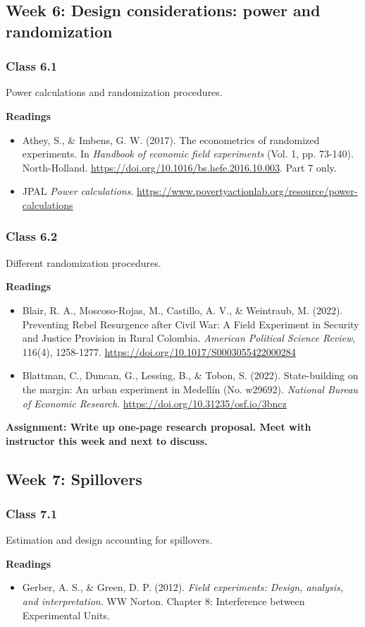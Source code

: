 \documentclass[letterpaper,12pt,parskip=full,DIV=10]{scrartcl}
\newcommand{\courseweek}[2]{\Needspace{12\baselineskip}\subsection*{Week #1: #2}}
\newcommand{\class}[2]{\Needspace{9\baselineskip}\subsubsection*{Class #1}\nopagebreak #2\par\nopagebreak\textbf{Readings}\par\nopagebreak}
\begin{document}
\courseweek{6}{Design considerations: power and randomization}

\class{6.1}{Power calculations and randomization procedures.}

\begin{itemize}

\item Athey, S., \& Imbens, G. W. (2017). The econometrics of randomized experiments. In \emph{Handbook of economic field experiments} (Vol. 1, pp. 73-140). North-Holland. \url{https://doi.org/10.1016/bs.hefe.2016.10.003}. Part 7 only.

\item JPAL \emph{Power calculations}.  \url{https://www.povertyactionlab.org/resource/power-calculations}

\end{itemize}

\class{6.2}{Different randomization procedures.}

\begin{itemize}

\item Blair, R. A., Moscoso-Rojas, M., Castillo, A. V., \& Weintraub, M. (2022). Preventing Rebel Resurgence after Civil War: A Field Experiment in Security and Justice Provision in Rural Colombia. \emph{American Political Science Review}, 116(4), 1258-1277. \url{https://doi.org/10.1017/S0003055422000284}

\item Blattman, C., Duncan, G., Lessing, B., \& Tobon, S. (2022). State-building on the margin: An urban experiment in Medellín (No. w29692). \emph{National Bureau of Economic Research}. \url{https://doi.org/10.31235/osf.io/3bncz}

\end{itemize}

\textbf{Assignment: Write up one-page research proposal. Meet with instructor this week and next to discuss.}

\courseweek{7}{Spillovers}

\class{7.1}{Estimation and design accounting for spillovers.}

\begin{itemize}

\item Gerber, A. S., \& Green, D. P. (2012). \emph{Field experiments: Design, analysis, and interpretation}. WW Norton. Chapter 8: Interference between Experimental Units.

\end{itemize}
\end{document}
